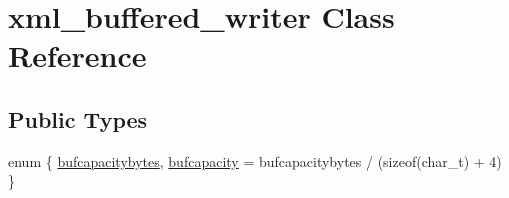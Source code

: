 \hypertarget{classxml__buffered__writer}{\section{xml\-\_\-buffered\-\_\-writer Class Reference}
\label{classxml__buffered__writer}
}
\subsection*{Public Types}
\begin{DoxyCompactItemize}
\item 
enum \{ \hyperlink{classxml__buffered__writer_a684aec07739ea6e60d47440eee97b4f6a9021e7b22ef17fba93b80380f0ffbbc8}{bufcapacitybytes}, 
\hyperlink{classxml__buffered__writer_a684aec07739ea6e60d47440eee97b4f6ab8b49b73105796783607f1f1ddd382cd}{bufcapacity} = bufcapacitybytes / (sizeof(char\-\_\-t) + 4)
 \}
\end{DoxyCompactItemize}
